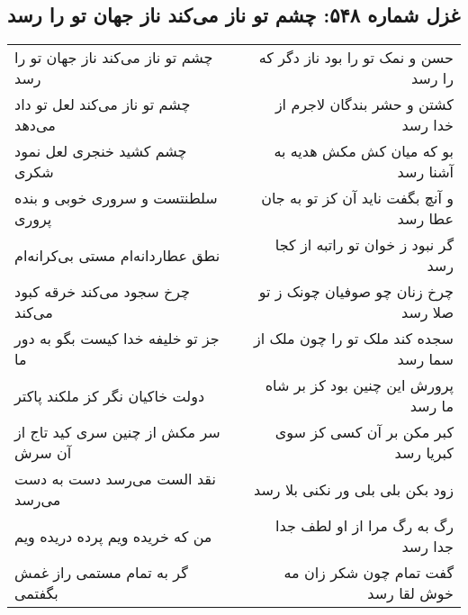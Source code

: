 \begin{center}
\section*{غزل شماره ۵۴۸: چشم تو ناز می‌کند ناز جهان تو را رسد}
\label{sec:0548}
\begin{longtable}{l p{0.5cm} r}
چشم تو ناز می‌کند ناز جهان تو را رسد
&&
حسن و نمک تو را بود ناز دگر که را رسد
\\
چشم تو ناز می‌کند لعل تو داد می‌دهد
&&
کشتن و حشر بندگان لاجرم از خدا رسد
\\
چشم کشید خنجری لعل نمود شکری
&&
بو که میان کش مکش هدیه به آشنا رسد
\\
سلطنتست و سروری خوبی و بنده پروری
&&
و آنچ بگفت ناید آن کز تو به جان عطا رسد
\\
نطق عطاردانه‌ام مستی بی‌کرانه‌ام
&&
گر نبود ز خوان تو راتبه از کجا رسد
\\
چرخ سجود می‌کند خرقه کبود می‌کند
&&
چرخ زنان چو صوفیان چونک ز تو صلا رسد
\\
جز تو خلیفه خدا کیست بگو به دور ما
&&
سجده کند ملک تو را چون ملک از سما رسد
\\
دولت خاکیان نگر کز ملکند پاکتر
&&
پرورش این چنین بود کز بر شاه ما رسد
\\
سر مکش از چنین سری کید تاج از آن سرش
&&
کبر مکن بر آن کسی کز سوی کبریا رسد
\\
نقد الست می‌رسد دست به دست می‌رسد
&&
زود بکن بلی بلی ور نکنی بلا رسد
\\
من که خریده ویم پرده دریده ویم
&&
رگ به رگ مرا از او لطف جدا جدا رسد
\\
گر به تمام مستمی راز غمش بگفتمی
&&
گفت تمام چون شکر زان مه خوش لقا رسد
\\
\end{longtable}
\end{center}

